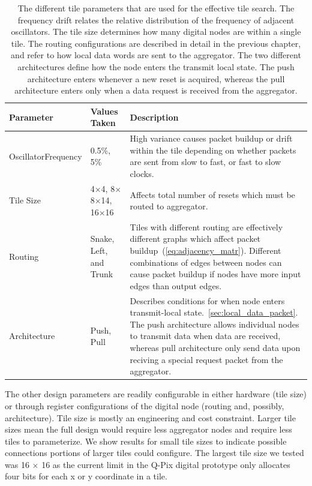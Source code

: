 \begin{table}
\begin{center}
\begin{tabular}{|| p{30mm} | p{30mm} | p{90mm} ||}
 \hline
 Parameter & Values Taken & Description \\ [0.5ex]
 \hline\hline
  Oscillator\newline Frequency & 0.5\%, 5\% & High variance causes packet buildup or drift within the tile depending on whether packets are sent from slow to fast, or fast to slow clocks. \\
 \hline
  Tile Size & 4$\times$4, 8$\times$8\newline 10$\times$14, 16$\times$16 & Affects total number of resets which must be routed to aggregator.\\
 \hline
  Routing & Snake, Left, and Trunk & Tiles with different routing are effectively different graphs which affect packet buildup~(\ref{eq:adjacency_matr}). Different combinations of edges between nodes can cause packet buildup if nodes have more input edges than output edges.  \\
 \hline
  Architecture & Push, Pull & Describes conditions for when node enters transmit-local state.~\ref{sec:local_data_packet}. The push architecture allows individual nodes to transmit data when data are received, whereas pull architecture only send data upon reciving a special request packet from the aggregator.  \\
 \hline
\end{tabular}
\caption{The different tile parameters that are used for the effective tile search.
  The frequency drift relates the relative distribution of the frequency of adjacent oscillators.
  The tile size determines how many digital nodes are within a single tile.
  The routing configurations are described in detail in the previous chapter, and refer to how local data words are sent to the aggregator.
  The two different architectures define how the node enters the transmit local state.
  The push architecture enters whenever a new reset is acquired, whereas the pull architecture enters only when a data request is received from the aggregator.}
\label{table:tile_params}
\end{center}
\end{table}

The other design parameters are readily configurable in either hardware (tile size) or through register configurations of the digital node (routing and, possibly, architecture).
Tile size is mostly an engineering and cost constraint.
Larger tile sizes mean the full design would require less aggregator nodes and require less tiles to parameterize.
We show results for small tile sizes to indicate possible connections portions of larger tiles could configure.
The largest tile size we tested was 16 $\times$ 16 as the current limit in the Q-Pix digital prototype only allocates four bits for each x or y coordinate in a tile.

